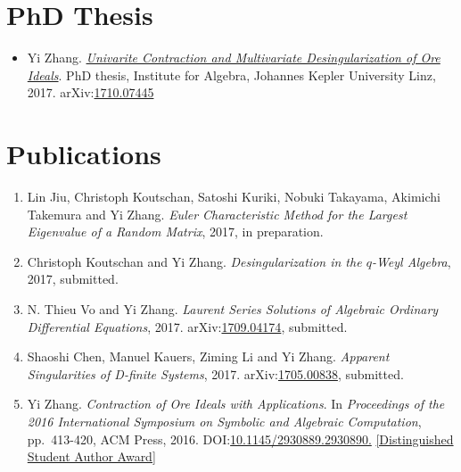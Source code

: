 \documentclass[a4paper,12pt]{article}
\begin{document}
\section*{\Large{PhD Thesis}}
\begin{itemize}
 \item Yi Zhang. \href{https://yzhang1616.github.io/yzhang_PhDthesis_final.pdf}{{\em Univarite 
                Contraction and Multivariate Desingularization of Ore Ideals}}. 
                PhD thesis, Institute for Algebra, Johannes Kepler University Linz, 2017. 
                arXiv:\href{https://arxiv.org/abs/1710.07445}{1710.07445}
\end{itemize}


\section*{\Large{Publications}}
\begin{enumerate}
\item Lin Jiu, Christoph Koutschan, Satoshi Kuriki, Nobuki Takayama, Akimichi Takemura and Yi Zhang. 
 {\em Euler Characteristic Method for the Largest Eigenvalue of a Random Matrix}, 2017, in preparation. 
\item Christoph Koutschan and Yi Zhang. {\em Desingularization in the $q$-Weyl Algebra}, 2017, submitted.  
\item N. Thieu Vo and Yi Zhang. {\em Laurent Series Solutions of Algebraic Ordinary Differential Equations}, 2017. 
 arXiv:\href{https://arxiv.org/abs/1709.04174}{1709.04174}, submitted. 
\item Shaoshi Chen, Manuel Kauers, Ziming Li and Yi Zhang. {\em Apparent Singularities of D-finite Systems}, 2017. 
 arXiv:\href{http://arxiv.org/abs/1705.00838}{1705.00838}, submitted.
\item Yi Zhang. {\em Contraction of Ore Ideals with Applications}. 
In {\em Proceedings of the 2016 International Symposium on Symbolic and Algebraic Computation}, 
pp.\ 413-420, ACM Press, 2016. DOI:\href{http://dl.acm.org/citation.cfm?id=2930890}{10.1145/2930889.2930890.} 
\href{https://www.sigsam.org/Awards/ISSACAwards.html}{[Distinguished Student Author Award]}
\end{enumerate}
\end{document}
